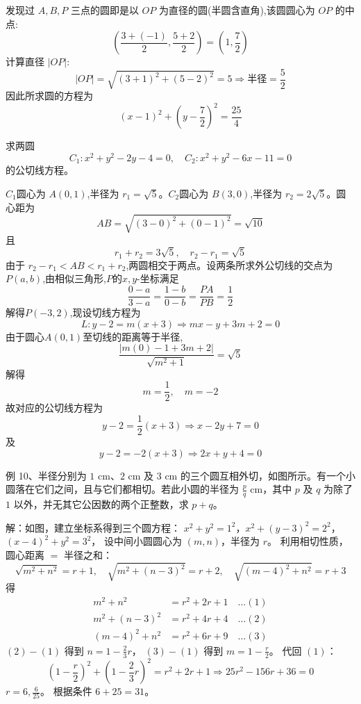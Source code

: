 \begin{questions}
\begin{solution}
        发现过 \(A,B,P\) 三点的圆即是以 \(OP\) 为直径的圆(半圆含直角),该圆圆心为 \(OP\) 的中点:
        \[
       \left( \frac{3 + (-1)}{2}, \frac{5 + 2}{2} \right) = (1, \frac{7}{2})
        \]
        计算直径 \(|OP|\):
        \[
        |OP| = \sqrt{(3 + 1)^2 + (5 - 2)^2} = 5
        \Rightarrow \text{半径} = \frac{5}{2}
        \]
        因此所求圆的方程为
        \[
        (x - 1)^2 + \left(y - \frac{7}{2} \right)^2 = \frac{25}{4}
        \]
    \end{solution}

    \question 求两圆
    \[
    C_1: x^2+y^2-2y-4=0, \quad C_2: x^2+y^2-6x-11=0
    \]
    的公切线方程。
    \begin{solution}
        $C_1$圆心为 $A(0,1)$,半径为 $r_1 = \sqrt{5}$。$C_2$圆心为 $B(3,0)$,半径为 $r_2 = 2\sqrt{5}$。圆心距为
        \[
        AB = \sqrt{(3-0)^2 + (0-1)^2} = \sqrt{10}
        \]
        且
        \[
        r_1 + r_2 = 3\sqrt{5}, \quad r_2 - r_1 = \sqrt{5}
        \]
        由于 $r_2-r_1 < AB < r_1+r_2$,两圆相交于两点。设两条所求外公切线的交点为 $P(a,b)$,由相似三角形,$P$的$x,y$-坐标满足
        \[
        \frac{0-a}{3-a}=\frac{1-b}{0-b}=\frac{PA}{PB}=\frac{1}{2}
        \]
        解得$P(-3,2)$,现设切线方程为 
        \[
        L: y-2 = m(x+3) \Rightarrow mx - y + 3m + 2 = 0
        \]
        由于圆心$A(0,1)$至切线的距离等于半径,
        \[
        \frac{|m(0)-1+3m+2|}{\sqrt{m^2+1}} = \sqrt{5} 
        \]
        解得
        \[
        m = \frac{1}{2}, \quad m = -2
        \]
        故对应的公切线方程为
        \[
        y-2 = \frac{1}{2}(x+3) \Rightarrow x - 2y + 7 =0
        \]
        及
        \[
        y-2 = -2(x+3) \Rightarrow 2x + y +4 = 0
        \]
    \end{solution}

    \question
例 10、半径分别为 $1\text{ cm}、2\text{ cm}$ 及 $3\text{ cm}$ 的三个圆互相外切，如图所示。有一个小圆落在它们之间，且与它们都相切。若此小圆的半径为 $\frac{p}{q}\text{ cm}$，其中 $p$ 及 $q$ 为除了 $1$ 以外，并无其它公因数的两个正整数，求 $p+q$。

\begin{solution}
解：如图，建立坐标系得到三个圆方程：
$x^2 + y^2 = 1^2$，$x^2 + (y-3)^2 = 2^2$，$(x-4)^2 + y^2 = 3^2$，
设中间小圆圆心为 $(m, n)$，半径为 $r$。
利用相切性质，圆心距离 $=$ 半径之和：
\[ \sqrt{m^2 + n^2} = r + 1, \quad \sqrt{m^2 + (n-3)^2} = r + 2, \quad \sqrt{(m-4)^2 + n^2} = r + 3 \]
得
\begin{align*}
m^2 + n^2 &= r^2 + 2r + 1 \quad \dots (1) \\
m^2 + (n-3)^2 &= r^2 + 4r + 4 \quad \dots (2) \\
(m-4)^2 + n^2 &= r^2 + 6r + 9 \quad \dots (3)
\end{align*}
$(2) - (1)$ 得到 $n = 1 - \frac{2}{3}r$，
$(3) - (1)$ 得到 $m = 1 - \frac{r}{2}$。
代回 $(1)$：
\[ \left( 1 - \frac{r}{2} \right)^2 + \left( 1 - \frac{2}{3}r \right)^2 = r^2 + 2r + 1 \Rightarrow 25r^2 - 156r + 36 = 0 \]
$r = 6, \frac{6}{25}$。
根据条件 $6 + 25 = 31$。
\end{solution}


\end{questions}

